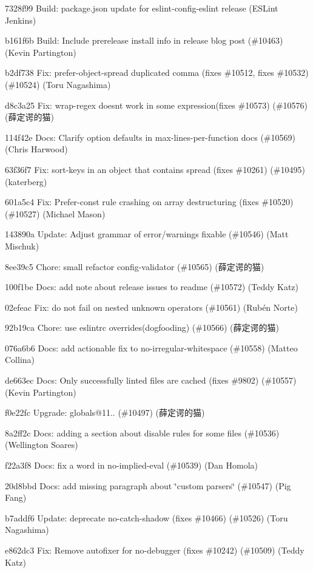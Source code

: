 \begin{DoxyItemize}
\item 7328f99 Build\+: package.\+json update for eslint-\/config-\/eslint release (E\+S\+Lint Jenkins)
\item b161f6b Build\+: Include prerelease install info in release blog post (\#10463) (Kevin Partington)
\item b2df738 Fix\+: prefer-\/object-\/spread duplicated comma (fixes \#10512, fixes \#10532) (\#10524) (Toru Nagashima)
\item d8c3a25 Fix\+: wrap-\/regex doesn\textquotesingle{}t work in some expression(fixes \#10573) (\#10576) (薛定谔的猫)
\item 114f42e Docs\+: Clarify option defaults in max-\/lines-\/per-\/function docs (\#10569) (Chris Harwood)
\item 63f36f7 Fix\+: sort-\/keys in an object that contains spread (fixes \#10261) (\#10495) (katerberg)
\item 601a5c4 Fix\+: Prefer-\/const rule crashing on array destructuring (fixes \#10520) (\#10527) (Michael Mason)
\item 143890a Update\+: Adjust grammar of error/warnings fixable (\#10546) (Matt Mischuk)
\item 8ee39c5 Chore\+: small refactor config-\/validator (\#10565) (薛定谔的猫)
\item 100f1be Docs\+: add note about release issues to readme (\#10572) (Teddy Katz)
\item 02efeac Fix\+: do not fail on nested unknown operators (\#10561) (Rubén Norte)
\item 92b19ca Chore\+: use eslintrc overrides(dogfooding) (\#10566) (薛定谔的猫)
\item 076a6b6 Docs\+: add actionable fix to no-\/irregular-\/whitespace (\#10558) (Matteo Collina)
\item de663ec Docs\+: Only successfully linted files are cached (fixes \#9802) (\#10557) (Kevin Partington)
\item f0e22fc Upgrade\+: globals@11.. (\#10497) (薛定谔的猫)
\item 8a2ff2c Docs\+: adding a section about disable rules for some files (\#10536) (Wellington Soares)
\item f22a3f8 Docs\+: fix a word in no-\/implied-\/eval (\#10539) (Dan Homola)
\item 20d8bbd Docs\+: add missing paragraph about \char`\"{}custom parsers\char`\"{} (\#10547) (Pig Fang)
\item b7addf6 Update\+: deprecate no-\/catch-\/shadow (fixes \#10466) (\#10526) (Toru Nagashima)
\item e862dc3 Fix\+: Remove autofixer for no-\/debugger (fixes \#10242) (\#10509) (Teddy Katz)
\end{DoxyItemize}

